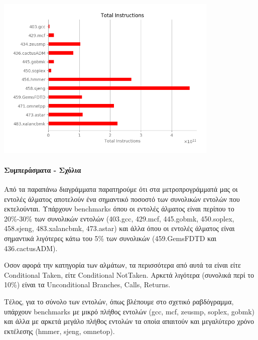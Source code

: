    \begin{minipage}{\textwidth}
      \begin{center}
         \vspace{3mm}
         \includegraphics[width=0.8\textwidth, frame]{./graphs/4-1/total.png}
         \vspace{6mm}
      \end{center}
   \end{minipage}

   \paragraph{Συμπεράσματα - Σχόλια}

   Από τα παραπάνω διαγράμματα παρατηρούμε ότι στα μετροπρογράμματά μας οι
   εντολές άλματος αποτελούν ένα σημαντικό ποσοστό των συνολικών εντολών που
   εκτελούνται. Υπάρχουν benchmarks όπου οι εντολές άλματος είναι περίπου το
   20\%-30\% των συνολικών εντολών (403.gcc, 429.mcf, 445.gobmk, 450.soplex,
   458.sjeng, 483.xalancbmk, 473.astar) και άλλα όπου οι εντολές άλματος είναι
   σημαντικά λιγότερες κάτω του 5\% των συνολικών (459.GemsFDTD και
   436.cactusADM).
   
   Οσον αφορά την κατηγορία των αλμάτων, τα περισσότερα από αυτά τα είναι είτε
   Conditional Taken, είτε Conditional NotTaken. Αρκετά λιγότερα (συνολικά περί
   το 10\%) είναι τα Unconditional Branches, Calls, Returns.
   
   Τέλος, για το σύνολο των εντολών, όπως βλέπουμε στο σχετικό ραβδόγραμμα,
   υπάρχουν benchmarks με μικρό πλήθος εντολών (gcc, mcf, zeusmp, soplex, gobmk)
   και άλλα με αρκετά μεγάλο πλήθος εντολών τα οποία απαιτούν και μεγαλύτερο
   χρόνο εκτέλεσης (hmmer, sjeng, omnetop).
   